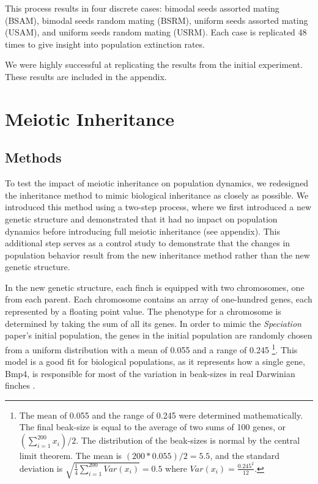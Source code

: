 \documentclass{article}
\begin{document}
This process results in four discrete cases: bimodal seeds assorted mating (BSAM), bimodal seeds random mating (BSRM), uniform seeds assorted mating (USAM), and uniform seeds random mating (USRM). Each case is replicated 48 times to give insight into population extinction rates. 

We were highly successful at replicating the results from the initial experiment. These results are included in the appendix. 



\section{Meiotic Inheritance}

\subsection{Methods}

To test the impact of meiotic inheritance on population dynamics, we redesigned the inheritance method to mimic biological inheritance as closely as possible. We introduced this method using a two-step process, where we first introduced a new genetic structure and demonstrated that it had no impact on population dynamics before introducing full meiotic inheritance (see appendix). This additional step serves as a control study to demonstrate that the changes in population behavior result from the new inheritance method rather than the new genetic structure.

In the new genetic structure, each finch is equipped with two chromosomes, one from each parent. Each chromosome contains an array of one-hundred genes, each represented by a floating point value. The phenotype for a chromosome is determined by taking the sum of all its genes. In order to mimic the \textit{Speciation} paper’s initial population, the genes in the initial population are randomly chosen from a uniform distribution with a mean of 0.055 and a range of 0.245 \footnote{The mean of 0.055 and the range of 0.245 were determined mathematically. The final beak-size is equal to the average of two sums of 100 genes, or $(\sum_{i=1}^{200} x_{i})/2$. The distribution of the beak-sizes is normal by the central limit theorem. The mean is $(200 * 0.055)/2 = 5.5$, and the standard deviation is $\sqrt{\frac{1}{4}\sum_{i=1}^{200}Var(x_{i})} = 0.5$ where $Var(x_{i}) = \frac{0.245^2}{12}$.}. This model is a good fit for biological populations, as it represents how a single gene, Bmp4, is responsible for most of the variation in beak-sizes in real Darwinian finches \cite{BMP4}. 
\end{document}
